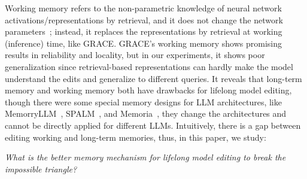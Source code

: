 \documentclass{article}
\begin{document}
Working memory refers to the non-parametric knowledge of neural network activations/representations by retrieval, and it does not change the network parameters~\cite{llm_controllable_working_memory}; instead, it replaces the representations by retrieval at working (inference) time, like GRACE. 
GRACE's working memory shows promising results in reliability and locality, but in our experiments, it shows poor generalization since retrieval-based representations can hardly make the model understand the edits and generalize to different queries. 
It reveals that long-term memory and working memory both have drawbacks for lifelong model editing, though there were some special memory designs for LLM architectures, like MemorryLLM~\cite{memoryllm}, SPALM~\cite{spalm}, and Memoria~\cite{memoria}, they change the architectures and cannot be directly applied for different LLMs.
Intuitively, there is a gap between editing working and long-term memories, thus, in this paper, we study:

 \begin{tcolorbox}[notitle, rounded corners, colframe=darkgrey, colback=white, boxrule=2pt, boxsep=0pt, left=0.15cm, right=0.17cm, enhanced, shadow={2.5pt}{-2.5pt}{0pt}{opacity=5,mygrey},toprule=2pt, before skip=0.65em, after skip=0.75em 
  ]
\emph{
  {
    \centering 
  {
    \fontsize{9.5pt}{13.2pt}\selectfont 
    What is the better memory mechanism for lifelong model editing to break the impossible triangle? 
  }
  \\
  }
  }
\end{tcolorbox}
\end{document}
